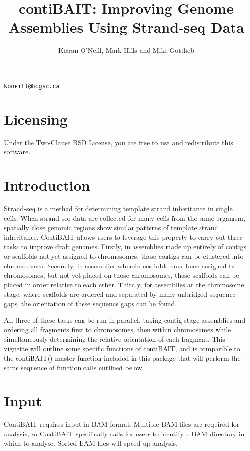 \documentclass{article}
\title{contiBAIT: Improving Genome Assemblies Using Strand-seq Data}
\author{Kieran O'Neill, Mark Hills and Mike Gottlieb}
\begin{document}


\maketitle
\begin{center}
{\tt koneill@bcgsc.ca}
\end{center}

\textnormal{\normalfont}

\tableofcontents
\newpage

\section{Licensing}
Under the Two-Clause BSD License, you are free to use and redistribute this software.

\section{Introduction}
Strand-seq is a method for determining template strand inheritance in single cells.
When strand-seq data are collected for many cells from the same organism, spatially close genomic regions show similar patterns of template strand inheritance.
ContiBAIT allows users to leverage this property to carry out three tasks to improve draft genomes. Firstly, in assemblies made up entirely of contigs or scaffolds not yet assigned to chromosomes, these contigs can be clustered into chromosomes. Secondly, in assemblies wherein scaffolds have been assigned to chromosomes, but not yet placed on those chromosomes, those scaffolds can be placed in order relative to each other. Thirdly, for assemblies at the chromosome stage, where scaffolds are ordered and separated by many unbridged sequence gaps, the orientation of these sequence gaps can be found.  

All three of these tasks can be run in parallel, taking contig-stage assemblies and ordering all fragments first to chromosomes, then within chromosomes while simultaneously determining the relative orientation of each fragment. This vignette will outline some specific functions of contiBAIT, and is comparible to the contiBAIT() master function included in this package that will perform the same sequence of function calls outlined below.

\section{Input}
ContiBAIT requires input in BAM format. Multiple BAM files are required for analysis, so ContiBAIT specifically calls for users to identify a BAM directory in which to analyse. Sorted BAM files will speed up analysis. 
 
\end{document}
